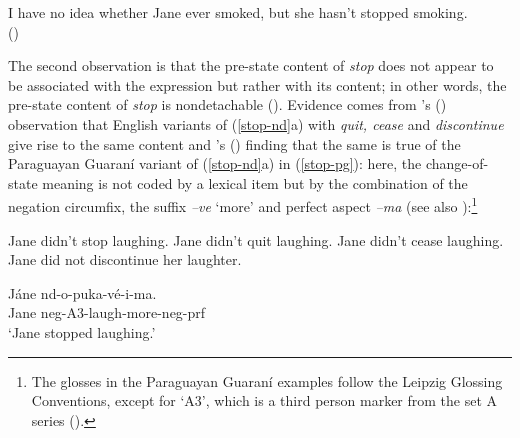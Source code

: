 \documentclass[a4paper,12pt]{article}
\newcommand{\6}{\mbox{$[\hspace*{-.6mm}[$}}
\newcommand{\9}{\mbox{$]\hspace*{-.6mm}]$}}
\newcommand{\citetpos}[1]{\citeauthor{#1}'s (\citeyear{#1})}
\begin{document}
\begin{exe}
\ex\label{stop-ei} I have no idea whether Jane ever smoked, but she hasn't stopped smoking. \\ \hspace*{.2cm} \hfill (\citealt[433]{simons01})
\end{exe}
The second observation is that the pre-state content of {\em stop} does not appear to be associated with the expression but rather with its content; in other words, the pre-state content of {\em stop} is nondetachable (\citealt{grice75}). Evidence comes from \citetpos{simons01} observation that English variants of (\ref{stop-nd}a) with {\em quit, cease} and {\em discontinue} give rise to the same content and \citetpos{brst-lang11} finding that the same is true of the Paraguayan Guaran\'i variant of (\ref{stop-nd}a) in (\ref{stop-pg}): here, the change-of-state meaning is not coded by a lexical item but by the combination of the negation circumfix, the suffix {\em --ve} `more' and perfect aspect  {\em --ma} (see also \citealt{levinson-annamalai92}):\footnote{The glosses in the Paraguayan Guaran\'i examples follow the Leipzig Glossing Conventions, except for `A3', which is a third person marker from the set A series (\citealt{tonhauser-bruno}).}

\begin{exe}
\ex\label{stop-nd} \citealt[435]{simons01}
\begin{xlist}
\ex Jane didn't stop laughing.
\ex Jane didn't quit laughing.
\ex Jane didn't cease laughing. 
\ex Jane did not discontinue her laughter.
\end{xlist}

\ex\label{stop-pg} \gll J\'ane nd-o-puka-v\'e-i-ma. \\ Jane {\sc neg-}A3-laugh-more{\sc -neg-prf} \\ \glt `Jane stopped laughing.' 
\end{exe}
\end{document}
